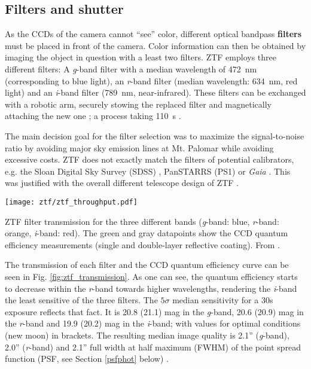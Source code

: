 \subsection{Filters and shutter} \label{ztf_filters}
As the CCDs of the camera cannot ``see'' color, different optical bandpass \textbf{filters} must be placed in front of the camera. Color information can then be obtained by imaging the object in question with a least two filters. ZTF employs three different filters: A \textit{g}-band filter with a median wavelength of \SI{472}{\nano \meter} (corresponding to blue light), an \textit{r}-band filter (median wavelength: \SI{634}{\nano \meter}, red light) and an \textit{i}-band filter (\SI{789}{\nano \meter}, near-infrared). These filters can be exchanged with a robotic arm, securely stowing the replaced filter and magnetically attaching the new one \cite{Dekany2020}; a process taking \SI{110}{\second} \cite{Bellm2019}. 

The main decision goal for the filter selection was to maximize the signal-to-noise ratio by avoiding major sky emission lines at Mt. Palomar while avoiding excessive costs. ZTF does not exactly match the filters of potential calibrators, e.g. the Sloan Digital Sky Survey (SDSS) , PanSTARRS (PS1)  or \textit{Gaia} . This was justified with the overall different telescope design of ZTF \cite{Bellm2019}.

\begin{marginfigure}
    \texttt{[image: ztf/ztf\_throughput.pdf]}
    \caption[ZTF filter transmission]{ZTF filter transmission for the three different bands (\textit{g}-band: blue, \textit{r}-band: orange, \textit{i}-band: red). The green and gray datapoints show the CCD quantum efficiency measurements (single and double-layer reflective coating). From \cite{Bellm2019}.}
\end{marginfigure}

The transmission of each filter and the CCD quantum efficiency curve can be seen in Fig. \ref{fig:ztf_transmission}. As one can see, the quantum efficiency starts to decrease within the \textit{r}-band towards higher wavelengths, rendering the \textit{i}-band the least sensitive of the three filters. The $5\sigma$ median sensitivity for a 30s exposure reflects that fact. It is 20.8 (21.1) mag in the \textit{g}-band, 20.6 (20.9) mag in the \textit{r}-band and 19.9 (20.2) mag in the \textit{i}-band; with values for optimal conditions (new moon) in brackets. The resulting median image quality is 2.1'' (\textit{g}-band), 2.0'' (\textit{r}-band) and 2.1'' full width at half maximum (FWHM) of the point spread function (PSF, see Section \ref{psfphot} below) \cite{Bellm2019}.

